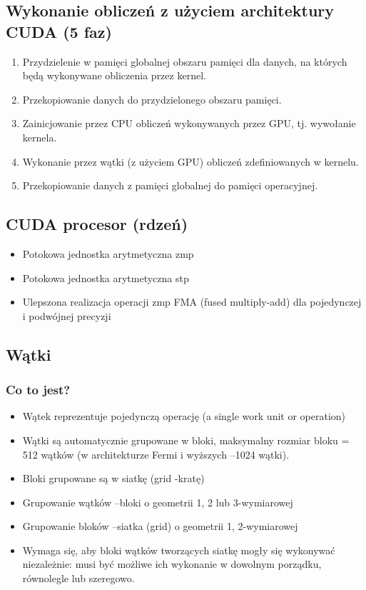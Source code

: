 	\subsection{Wykonanie obliczeń z użyciem architektury CUDA (5 faz)}
		\begin{enumerate}
			\item Przydzielenie w pamięci globalnej obszaru pamięci dla danych, na których będą wykonywane obliczenia przez kernel.
			\item Przekopiowanie danych do przydzielonego obszaru pamięci.
			\item Zainicjowanie przez CPU obliczeń wykonywanych przez GPU, tj. wywołanie kernela.
			\item Wykonanie przez wątki (z użyciem GPU) obliczeń zdefiniowanych w kernelu.
			\item Przekopiowanie danych z pamięci globalnej do pamięci operacyjnej.
		\end{enumerate}
	\subsection{CUDA procesor (rdzeń)}
		\begin{itemize}
			\item Potokowa jednostka arytmetyczna zmp
			\item Potokowa jednostka arytmetyczna stp
			\item Ulepszona realizacja operacji zmp FMA (fused multiply-add) dla pojedynczej i podwójnej precyzji
		\end{itemize}

	\subsection{Wątki}
		\subsubsection{Co to jest?}
			\begin{itemize}
				\item Wątek reprezentuje pojedynczą operację (a single work unit or operation)
				\item Wątki są automatycznie grupowane w bloki, maksymalny rozmiar bloku = 512 wątków (w architekturze Fermi i wyższych –1024 wątki).
				\item Bloki grupowane są w siatkę (grid -kratę)
				\item Grupowanie wątków –bloki o geometrii 1, 2 lub 3-wymiarowej
				\item Grupowanie bloków –siatka (grid) o geometrii 1, 2-wymiarowej
				\item Wymaga się, aby bloki wątków tworzących siatkę mogły się wykonywać niezależnie: musi być możliwe ich wykonanie w dowolnym porządku, równolegle lub szeregowo.
			\end{itemize}
